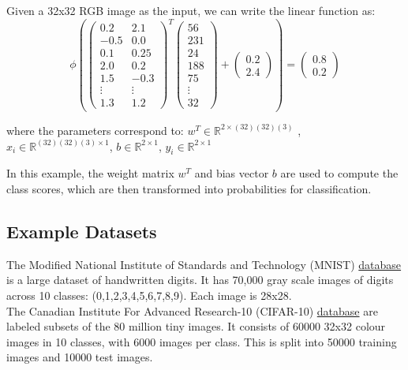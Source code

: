 \documentclass{article}
\begin{document}
Given a 32x32 RGB image as the input, we can write the linear function as: 
\[
\phi \left( 
\begin{pmatrix}
  0.2 & 2.1 \\
 -0.5 & 0.0 \\
  0.1 & 0.25 \\
  2.0 & 0.2 \\
  1.5 & -0.3 \\
  \vdots & \vdots \\
  1.3 & 1.2
\end{pmatrix}^T
\begin{pmatrix}
  56 \\
  231 \\
  24 \\
  188 \\
  75 \\
  \vdots \\
  32
\end{pmatrix}
+ 
\begin{pmatrix}
  0.2 \\
  2.4
\end{pmatrix}
\right) = 
\begin{pmatrix}
  0.8 \\
  0.2
\end{pmatrix}
\]

\begin{center}
where the parameters correspond to:
    $w^T \in \mathbb{R}^{2 \times(32)(32)(3)}$ , $x_i \in \mathbb{R}^{(32)(32)(3) \times 1}$, $b \in \mathbb{R}^{2 \times 1} $, $y_i \in \mathbb{R}^{2 \times 1} $
\end{center}
In this example, the weight matrix  $w^T$ and bias vector $b$ are used to compute the class scores, which are then transformed into probabilities for classification.  
\subsection{Example Datasets}

The Modified National Institute of Standards and Technology (MNIST) \href{https://yann.lecun.com/exdb/mnist/}{database} is a large dataset of handwritten digits. It has 70,000 gray scale images of digits across 10 classes: (0,1,2,3,4,5,6,7,8,9). Each image is 28x28.
\newline
\\
The Canadian Institute For Advanced Research-10 (CIFAR-10) \href{https://www.cs.toronto.edu/~kriz/cifar.html}{database}  are labeled subsets of the 80 million tiny images. It consists of 60000 32x32 colour images in 10 classes, with 6000 images per class. This is split into 50000 training images and 10000 test images.
\end{document}
